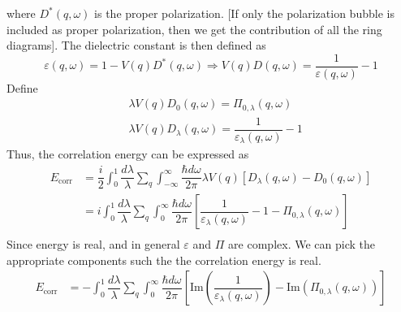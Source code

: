 \documentclass[aps,prb,onecolumn,notitlepage,showpacs,floatfix,superscriptaddress]{revtex4-1}
\begin{document}
where $D^*(q,\omega)$ is the proper polarization. [If only the polarization bubble is included as proper polarization, then we get the contribution of all the ring diagrams].
%
The dielectric constant is then defined as
\begin{equation}
\varepsilon(q,\omega) = 1-V(q)D^*(q,\omega) \Rightarrow V(q)D(q,\omega) = \dfrac{1}{\varepsilon(q,\omega)}-1
\end{equation}
Define
\begin{equation}
\begin{split}
& \lambda  V(q)D_{0}(q,\omega) = \Pi_{0,\lambda}(q,\omega) \\
& \lambda V(q)D_{\lambda}(q,\omega) = \dfrac{1}{\varepsilon_{\lambda}(q,\omega)}-1
\end{split}
\end{equation}
Thus, the correlation energy can be expressed as 
\begin{equation}
\begin{split}
E_{\mathrm{corr}}&=\dfrac{i}{2}\int_0^1\dfrac{d\lambda}{\lambda} \sum_{q} \int_{-\infty}^{\infty} \dfrac{\hbar d\omega}{2\pi} \lambda V(q) \left[ D_{\lambda}(q,\omega)- D_{0}(q,\omega) \right] \\
&=i\int_0^1\dfrac{d\lambda}{\lambda} \sum_{q} \int_{0}^{\infty} \dfrac{\hbar d\omega}{2\pi} \left[ \dfrac{1}{\varepsilon_{\lambda}(q,\omega)}-1- \Pi_{0,\lambda}(q,\omega) \right] \\
\end{split}
\end{equation}
Since energy is real, and in general $\varepsilon$ and $\Pi$ are complex. We can pick the appropriate components such the the correlation energy is real.
\begin{equation}
\begin{split}
E_{\mathrm{corr}}&=-\int_0^1\dfrac{d\lambda}{\lambda} \sum_{q} \int_{0}^{\infty} \dfrac{\hbar d\omega}{2\pi} \left[\mathrm{Im}\left( \dfrac{1}{\varepsilon_{\lambda}(q,\omega)} \right)- \mathrm{Im}\left(\Pi_{0,\lambda}(q,\omega) \right) \right] \\
\end{split}
\end{equation}
\end{document}
